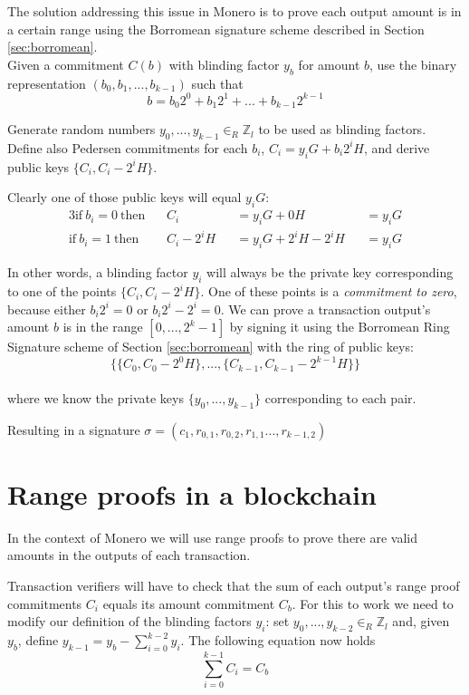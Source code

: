 The solution addressing this issue in Monero is to prove each output amount is in a certain range using the Borromean signature scheme described in Section \ref{sec:borromean}.
\\

Given a commitment $C(b)$ with blinding factor $y_b$ for amount \(b\), use the binary representation \((b_0, b_1, ..., b_{k-1})\) such that 
\[b = b_0 2^0 + b_1 2^1 + ... + b_{k-1} 2^{k-1}  \]

Generate random numbers \(y_0, ..., y_{k-1} \in_R \mathbb{Z}_l\) to be used as blinding factors.
Define also Pedersen commitments for each \(b_i\), \(C_ i = y_i G + b_i 2^i H\),  and derive public keys \(\{C_i, C_i - 2^i H\}\). 


Clearly one of those public keys will equal \(y_i G\):\\
\begin{alignat*}{3}
\textrm{if}\ b_i = 0 \ \textrm{then}\ \ \ &  \ C_i &&= y_i G + 0 H &&= y_i G \\
\textrm{if}\ b_i = 1 \ \textrm{then}\ \ \ & \ C_i - 2^i H &&= y_i G + 2^i H  - 2^i H &&= y_i G 
\end{alignat*}

In other words, a blinding factor \(y_i\) will always be the private key corresponding to one of the points \(\{C_i, C_i - 2^i H\}\). One of these points is a {\em commitment to zero}, because either $b_i 2^i = 0$ or $b_i 2^i - 2^i = 0$. We can prove a transaction output's amount $b$ is in the range $[0, ..., 2^{k} -1]$ by signing it using the Borromean Ring Signature scheme of Section \ref{sec:borromean} with the ring of public keys:
\[\{ \{C_0, C_0 - 2^0 H\}, ..., \{C_{k-1}, C_{k-1} - 2^{k-1} H\}  \}\]\\
where we know the private keys $\{y_0, ..., y_{k-1}\}$ corresponding to each pair.

\begin{center}
    Resulting in a signature $\sigma = (c_1, r_{0,1}, r_{0,2}, r_{1,1}..., r_{k-1,2})$
\end{center}


\section{Range proofs in a blockchain}
\label{range_proofs_blockchain_section}

In the context of Monero we will use range proofs to prove there are valid amounts in the outputs of each transaction.

Transaction verifiers will have to check that the sum of each output's range proof commitments $C_i$ equals its amount commitment $C_b$. For this to work we need to modify our definition of the blinding factors $y_i$: set $y_0, ..., y_{k-2} \in_R \mathbb{Z}_l$ and, given $y_b$, define $y_{k-1} = y_b - \sum_{i=0}^{k-2} y_i$. The following equation now holds
\[\sum^{k-1}_{i=0} C_i = C_b\]

